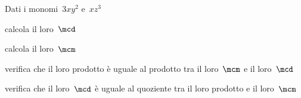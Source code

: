 \begin{esercizio}
\label{ese:9.49}
Dati i monomi~\(3xy^{2}\) e~\(xz^{3}\)

\begin{enumeratea}
\spazielenx
\item calcola il loro~\(\mcd\)
\item calcola il loro~\(\mcm\)
\item verifica che il loro prodotto è uguale al prodotto tra il 
loro~\(\mcm\) e il loro~\(\mcd\)
\item verifica che il loro~\(\mcd\) è uguale al quoziente tra il loro 
prodotto e il loro~\(\mcm\)
\end{enumeratea}
\end{esercizio}



